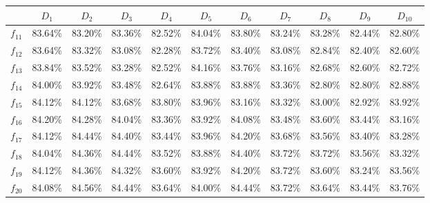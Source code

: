\documentclass{article} %
\begin{document}
\begin{table}[H]
    \hspace{-1.0cm}
    \begin{tabular}{|c|c|c|c|c|c|c|c|c|c|c|}
        \hline
        & $D_{1}$ & $D_{2}$ & $D_{3}$ & $D_{4}$ & $D_{5}$ & $D_{6}$ & $D_{7}$ & $D_{8}$ & $D_{9}$ & $D_{10}$ \\
        \hline
	$f_{11}$ & 83.64\% & 83.20\% & 83.36\% & 82.52\% & 84.04\% & 83.80\% & 83.24\% & 83.28\% & 82.44\% & 82.80\% \\
	$f_{12}$ & 83.64\% & 83.32\% & 83.08\% & 82.28\% & 83.72\% & 83.40\% & 83.08\% & 82.84\% & 82.40\% & 82.60\% \\
	$f_{13}$ & 83.84\% & 83.52\% & 83.28\% & 82.52\% & 84.16\% & 83.76\% & 83.16\% & 82.68\% & 82.60\% & 82.72\% \\
	$f_{14}$ & 84.00\% & 83.92\% & 83.48\% & 82.64\% & 83.88\% & 83.88\% & 83.36\% & 82.80\% & 82.80\% & 82.88\% \\
	$f_{15}$ & 84.12\% & 84.12\% & 83.68\% & 83.80\% & 83.96\% & 83.16\% & 83.32\% & 83.00\% & 82.92\% & 83.92\% \\
	$f_{16}$ & 84.20\% & 84.28\% & 84.04\% & 83.36\% & 83.92\% & 84.08\% & 83.48\% & 83.60\% & 83.44\% & 83.16\% \\
	$f_{17}$ & 84.12\% & 84.44\% & 84.40\% & 83.44\% & 83.96\% & 84.20\% & 83.68\% & 83.56\% & 83.40\% & 83.28\% \\
	$f_{18}$ & 84.04\% & 84.36\% & 84.44\% & 83.52\% & 83.88\% & 84.40\% & 83.72\% & 83.72\% & 83.56\% & 83.32\% \\
	$f_{19}$ & 84.12\% & 84.36\% & 84.32\% & 83.60\% & 83.92\% & 84.20\% & 83.72\% & 83.60\% & 83.24\% & 83.56\% \\
	$f_{20}$ & 84.08\% & 84.56\% & 84.44\% & 83.64\% & 84.00\% & 84.44\% & 83.72\% & 83.64\% & 83.44\% & 83.76\% \\
        \hline
    \end{tabular}
\end{table}
\end{document}
